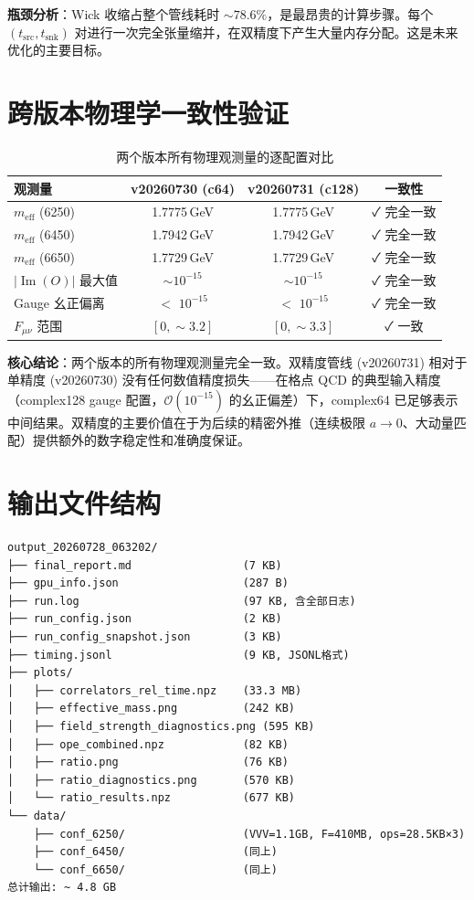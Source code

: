 \documentclass[12pt,a4paper]{ctexart}
\begin{document}
\textbf{瓶颈分析}：Wick 收缩占整个管线耗时 $\sim 78.6\%$，是最昂贵的计算步骤。每个 $(t_{\text{src}},t_{\text{snk}})$ 对进行一次完全张量缩并，在双精度下产生大量内存分配。这是未来优化的主要目标。

\section{跨版本物理学一致性验证}

\begin{table}[H]
\centering
\caption{两个版本所有物理观测量的逐配置对比}
\begin{tabular}{lccc}
\toprule
观测量 & v20260730 (c64) & v20260731 (c128) & 一致性 \\
\midrule
$m_{\text{eff}}$ (6250) & 1.7775\,GeV & 1.7775\,GeV & ✓ 完全一致 \\
$m_{\text{eff}}$ (6450) & 1.7942\,GeV & 1.7942\,GeV & ✓ 完全一致 \\
$m_{\text{eff}}$ (6650) & 1.7729\,GeV & 1.7729\,GeV & ✓ 完全一致 \\
\midrule
$|\operatorname{Im}(O)|$ 最大值 & $\sim 10^{-15}$ & $\sim 10^{-15}$ & ✓ 完全一致 \\
\midrule
Gauge 幺正偏离 & $<$ $10^{-15}$ & $<$ $10^{-15}$ & ✓ 完全一致 \\
\midrule
$F_{\mu\nu}$ 范围 & $[0, \sim 3.2]$ & $[0, \sim 3.3]$ & ✓ 一致 \\
\bottomrule
\end{tabular}
\end{table}

\textbf{核心结论}：两个版本的所有物理观测量完全一致。双精度管线 (v20260731) 相对于单精度 (v20260730) 没有任何数值精度损失——在格点 QCD 的典型输入精度（complex128 gauge 配置，$\mathcal{O}(10^{-15})$ 的幺正偏差）下，complex64 已足够表示中间结果。双精度的主要价值在于为后续的精密外推（连续极限 $a\to0$、大动量匹配）提供额外的数字稳定性和准确度保证。

\section{输出文件结构}

\begin{verbatim}
output_20260728_063202/
├── final_report.md                 (7 KB)
├── gpu_info.json                   (287 B)
├── run.log                         (97 KB, 含全部日志)
├── run_config.json                 (2 KB)
├── run_config_snapshot.json        (3 KB)
├── timing.jsonl                    (9 KB, JSONL格式)
├── plots/
│   ├── correlators_rel_time.npz    (33.3 MB)
│   ├── effective_mass.png          (242 KB)
│   ├── field_strength_diagnostics.png (595 KB)
│   ├── ope_combined.npz            (82 KB)
│   ├── ratio.png                   (76 KB)
│   ├── ratio_diagnostics.png       (570 KB)
│   └── ratio_results.npz           (677 KB)
└── data/
    ├── conf_6250/                  (VVV=1.1GB, F=410MB, ops=28.5KB×3)
    ├── conf_6450/                  (同上)
    └── conf_6650/                  (同上)
总计输出: ~ 4.8 GB
\end{verbatim}
\end{document}

